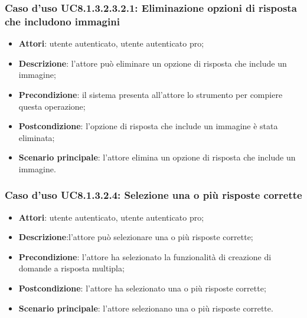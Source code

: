 \subsubsection{Caso d'uso UC8.1.3.2.3.2.1: Eliminazione opzioni di risposta che includono immagini}
		\begin{itemize}
		\item
			\textbf{Attori}: utente autenticato, utente autenticato pro;
		\item		
			\textbf{Descrizione}: l'attore può eliminare un opzione di risposta che include un immagine;
		\item
			\textbf{Precondizione}: il sistema presenta all'attore lo strumento per compiere questa operazione;
		\item
			\textbf{Postcondizione}: l'opzione di risposta che include un immagine è stata eliminata;
		\item
			\textbf{Scenario principale}: l'attore elimina un opzione di risposta che include un immagine.				
		\end{itemize}
\subsubsection{Caso d'uso UC8.1.3.2.4: Selezione una o più risposte corrette}
	\begin{itemize}
		\item
			\textbf{Attori}: utente autenticato, utente autenticato pro;
		\item		
			\textbf{Descrizione}:l'attore può selezionare una o più risposte corrette;
		\item
			\textbf{Precondizione}: l'attore ha selezionato la funzionalità di creazione di domande a risposta multipla; 
		\item
			\textbf{Postcondizione}: l'attore ha selezionato una o più risposte corrette;
		\item
			\textbf{Scenario principale}: l'attore selezionano una o più risposte corrette. 			
	\end{itemize}

	
	
	
	
	
	
	